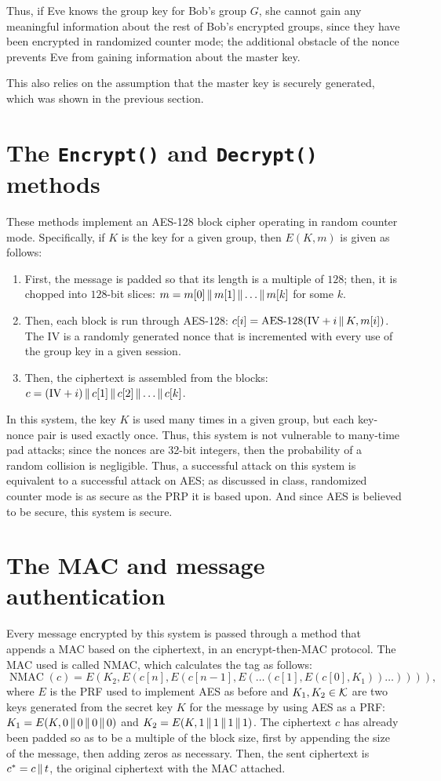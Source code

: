 \documentclass{amsart}
\begin{document}
Thus, if Eve knows the group key for Bob's group $G$, she cannot gain any meaningful information about the rest of Bob's encrypted groups, since they have been encrypted in randomized counter mode; the additional obstacle of the nonce prevents Eve from gaining information about the master key.

This also relies on the assumption that the master key is securely generated, which was shown in the previous section.%

\section{The \texttt{Encrypt()} and \texttt{Decrypt()} methods}%
These methods implement an AES-128 block cipher operating in random counter mode. Specifically, if $K$ is the key for a given group, then $E(K,m)$ is given as follows:
\begin{enumerate}
\item First, the message is padded so that its length is a multiple of $128$; then, it is chopped into $128$-bit slices: $m = m[0]\operatorname{\|} m[1]\operatorname{\|}\dots\operatorname{\|} m[k]$ for some $k$.
\item Then, each block is run through AES-128: $c[i] = \operatorname{AES-128}(\mathrm{IV} + i\operatorname{\|} K,m[i])$. The $\mathrm{IV}$ is a randomly generated nonce that is incremented with every use of the group key in a given session.
\item Then, the ciphertext is assembled from the blocks: $c = (\mathrm{IV} + i) \operatorname{\|} c[1] \operatorname{\|} c[2] \operatorname{\|}\dots\operatorname{\|} c[k]$.
\end{enumerate}
In this system, the key $K$ is used many times in a given group, but each key-nonce pair is used exactly once. Thus, this system is not vulnerable to many-time pad attacks; since the nonces are 32-bit integers, then the probability of a random collision is negligible. Thus, a successful attack on this system is equivalent to a successful attack on AES; as discussed in class, randomized counter mode is as secure as the PRP it is based upon. And since AES is believed to be secure, this system is secure.

\section{The MAC and message authentication}
Every message encrypted by this system is passed through a method that appends a MAC based on the ciphertext, in an encrypt-then-MAC protocol. The MAC used is called NMAC, which calculates the tag as follows:
\[\operatorname{NMAC}(c) = E(K_2,E(c[n],E(c[n-1],E(\dots(c[1],E(c[0],K_1))\dots)))),\]
where $E$ is the PRF used to implement AES as before and $K_1,K_2\in\mathcal K$ are two keys generated from the secret key $K$ for the message by using AES as a PRF: $K_1 = E(K,0\operatorname{\|} 0\operatorname{\|} 0\operatorname{\|} 0)$ and $K_2 = E(K,1\operatorname{\|} 1\operatorname{\|} 1\operatorname{\|} 1)$. The ciphertext $c$ has already been padded so as to be a multiple of the block size, first by appending the size of the message, then adding zeros as necessary. Then, the sent ciphertext is $c^* = c\operatorname{\|} t$, the original ciphertext with the MAC attached.
\end{document}
